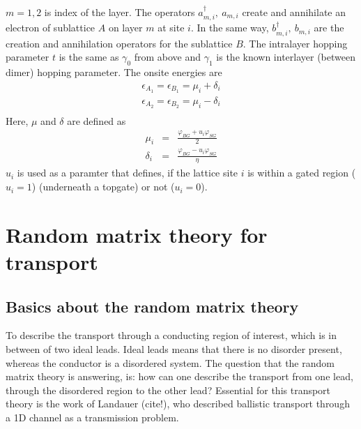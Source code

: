 $m = 1, 2$ is index of the layer. The operators $a^\dagger_{m, i},\ a_{m, i}$ create and annihilate an electron of sublattice $A$ on layer $m$ at site $i$. In the same way, $b^\dagger_{m, i},\ b_{m, i}$ are the creation and annihilation operators for the sublattice $B$. The intralayer hopping parameter $t$ is the same as $\gamma_0$ from above and $\gamma_1$ is the known interlayer (between dimer) hopping parameter. 
The onsite energies are
\begin{eqnarray}
\epsilon_{A_1} = \epsilon_{B_1} = \mu_i + \delta_i \\
\epsilon_{A_2} = \epsilon_{B_2} = \mu_i - \delta_i \\
\end{eqnarray}
Here, $\mu$ and $\delta$ are defined as 
\begin{eqnarray}
\mu_i &=& \frac{\varphi_{BG} + u_i \varphi_{SG}}{2} \\
\delta_i &=& \frac{\varphi_{BG} -  u_i \varphi_{SG}}{\eta}
\end{eqnarray}
$u_i$ is used as a paramter that defines, if the lattice site $i$ is within a gated region ($u_i = 1$) (underneath a topgate) or not ($u_i = 0$).

\section{Random matrix theory for transport}

\subsection{Basics about the random matrix theory}

To describe the transport through a conducting region of interest, which is in between of two ideal leads. Ideal leads means that there is no disorder present, whereas the conductor is a disordered system. The question that the random matrix theory is answering, is: how can one describe the transport from one lead, through the disordered region to the other lead? Essential for this transport theory is the work of Landauer (cite!), who described ballistic transport through a 1D channel as a transmission problem. 

